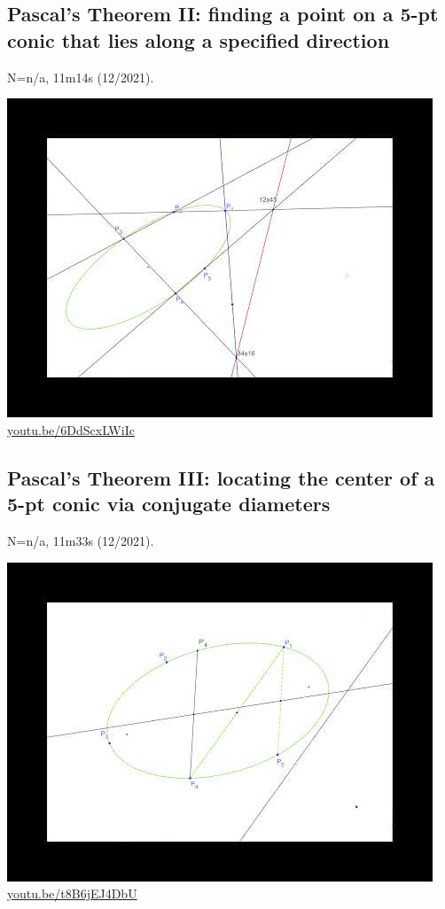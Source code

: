\documentclass[12pt]{amsart}
\begin{document}
\subsection{Pascal's Theorem II: finding a point on a 5-pt conic that lies along a specified direction}
\label{vid:6DdScxLWiIc}
\noindent N=n/a, 11m14s (12/2021). 
\begin{center}\includegraphics[width=.5\textwidth]{pics/6DdScxLWiIc.jpg} \\ 
\href{https://youtu.be/6DdScxLWiIc}{\url{youtu.be/6DdScxLWiIc}}\end{center}
% 

\subsection{Pascal's Theorem III: locating the center of a 5-pt conic via conjugate diameters}
\label{vid:t8B6jEJ4DbU}
\noindent N=n/a, 11m33s (12/2021). 
\begin{center}\includegraphics[width=.5\textwidth]{pics/t8B6jEJ4DbU.jpg} \\ 
\href{https://youtu.be/t8B6jEJ4DbU}{\url{youtu.be/t8B6jEJ4DbU}}\end{center}
% 
\end{document}
